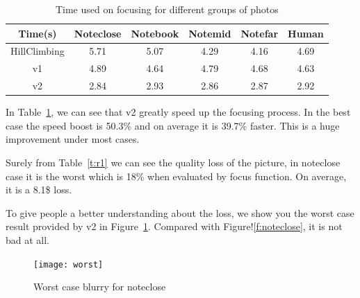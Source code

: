 \begin{table} [tb!]\scriptsize
	\centering
	\begin{tabular} {| c | c | c | c | c | c |}
		\hline
		Time(s) & \textbf{Noteclose} & \textbf{Notebook} & \textbf{Notemid} & \textbf{Notefar} & \textbf{Human} \\
		\hline
		HillClimbing & 5.71 & 5.07 & 4.29 & 4.16 & 4.69 \\
		\hline
		\sysname v1 & 4.89 & 4.64 & 4.79 & 4.68 & 4.63\\
		\hline
		\sysname v2 & 2.84 & 2.93 & 2.86 & 2.87 & 2.92\\
		\hline
	\end{tabular}
	\caption{Time used on focusing for different groups of photos}
	\label{t:r2}
\end{table}

In Table~\ref{t:r2}, we can see that \sysname v2 greatly speed up the focusing process.
In the best case the speed boost is 50.3\% and on average it is 39.7\% faster.
This is a huge improvement under most cases.

Surely from Table~\ref{t:r1} we can see the quality loss of the picture, in noteclose case it is the worst which is 18\% when evaluated by focus function.
On average, it is a 8.1\$ loss.

To give people a better understanding about the loss, we show you the worst case result provided by \sysname v2 in Figure~\ref{f:worst}.
Compared with Figure!\ref{f:noteclose}, it is not bad at all.

\begin{figure}[tb!]
	\begin{center}
		\texttt{[image: worst]}
	\end{center}
	\caption{Worst case blurry for noteclose}
	\label{f:worst}
\end{figure}


